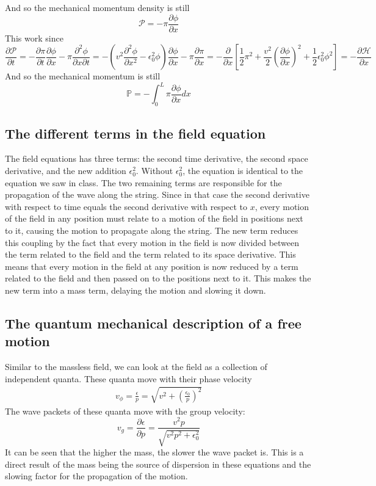 \documentclass{article}
\begin{document}
And so the mechanical momentum density is still
\begin{equation}
    \mathcal{P} = -\pi\frac{\partial \phi}{\partial x}
\end{equation}
This work since
\begin{equation}
    \frac{\partial \mathcal{P}}{\partial t} = -\frac{\partial \pi}{\partial t}\frac{\partial \phi}{\partial x} - \pi\frac{\partial^2 \phi}{\partial x \partial t} = -\left(v^2 \frac{\partial^2 \phi}{\partial x^2} - \epsilon_0^2 \phi\right)\frac{\partial \phi}{\partial x} - \pi\frac{\partial \pi}{\partial x} = -\frac{\partial}{\partial x} \left[
        \frac{1}{2}\pi^2 + \frac{v^2}{2} \left(\frac{\partial \phi}{\partial x}\right)^2 + \frac{1}{2}\epsilon_0^2\phi^2
    \right] =  -\frac{\partial \mathcal{H}}{\partial x}
\end{equation}
And so the mechanical momentum is still
\begin{equation}
    \mathbb{P} = -\int_0^L \pi\frac{\partial \phi}{\partial x} dx
\end{equation}
\subsection{The different terms in the field equation}
The field equations has three terms: the second time derivative, the second space derivative, and the new addition $\epsilon_0^2$. Without $\epsilon_0^2$, the equation is identical to the equation we saw in class. The two remaining terms are responsible for the propagation of the wave along the string. Since in that case the second derivative with respect to time equals the second derivative with respect to $x$, every motion of the field in any position must relate to a motion of the field in positions next to it, causing the motion to propagate along the string.
\newline
The new term reduces this coupling by the fact that every motion in the field is now divided between the term related to the field and the term related to its space derivative. This means that every motion in the field at any position is now reduced by a term related to the field and then passed on to the positions next to it. This makes the new term into a mass term, delaying the motion and slowing it down.
\subsection{The quantum mechanical description of a free motion}
Similar to the massless field, we can look at the field as a collection of independent quanta. These quanta move with their phase velocity
\begin{eqnarray}
    v_\phi = \frac{\epsilon}{p} = \sqrt{v^2 + \left(\frac{\epsilon_0}{p}\right)^2}
\end{eqnarray}
The wave packets of these quanta move with the group velocity:
\begin{equation}
    v_g = \frac{\partial \epsilon}{\partial p} = \frac{v^2p}{\sqrt{v^2p^2 + \epsilon_0^2}}
\end{equation}
It can be seen that the higher the mass, the slower the wave packet is. This is a direct result of the mass being the source of dispersion in these equations and the slowing factor for the propagation of the motion.
\end{document}
